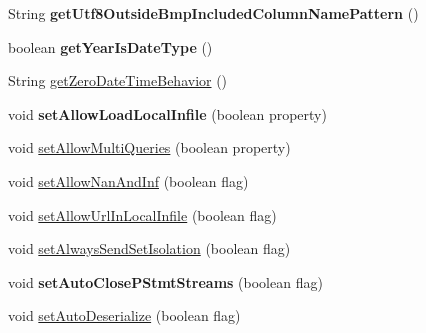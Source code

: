 \begin{DoxyCompactItemize}
\item 
\mbox{\label{classcom_1_1mysql_1_1jdbc_1_1jdbc2_1_1optional_1_1_connection_wrapper_a30e517662fc73bd209e067b44aeef223}} 
String {\bfseries get\+Utf8\+Outside\+Bmp\+Included\+Column\+Name\+Pattern} ()
\item 
\mbox{\label{classcom_1_1mysql_1_1jdbc_1_1jdbc2_1_1optional_1_1_connection_wrapper_a85e8f60aaad385ff2588c7a0cbbc981c}} 
boolean {\bfseries get\+Year\+Is\+Date\+Type} ()
\item 
String \mbox{\hyperlink{classcom_1_1mysql_1_1jdbc_1_1jdbc2_1_1optional_1_1_connection_wrapper_a018005289e60ac341a0911f9e1f9dbb8}{get\+Zero\+Date\+Time\+Behavior}} ()
\item 
\mbox{\label{classcom_1_1mysql_1_1jdbc_1_1jdbc2_1_1optional_1_1_connection_wrapper_a4f5c8e5489c20655846fc7d7ddcfd20c}} 
void {\bfseries set\+Allow\+Load\+Local\+Infile} (boolean property)
\item 
void \mbox{\hyperlink{classcom_1_1mysql_1_1jdbc_1_1jdbc2_1_1optional_1_1_connection_wrapper_a4a74a98581dab1e4f5bd0dde12c2ab23}{set\+Allow\+Multi\+Queries}} (boolean property)
\item 
void \mbox{\hyperlink{classcom_1_1mysql_1_1jdbc_1_1jdbc2_1_1optional_1_1_connection_wrapper_a3c630aa077ada90cbaf48a4653043fe5}{set\+Allow\+Nan\+And\+Inf}} (boolean flag)
\item 
void \mbox{\hyperlink{classcom_1_1mysql_1_1jdbc_1_1jdbc2_1_1optional_1_1_connection_wrapper_ae47387cb708cc1dfa15cda434a2738aa}{set\+Allow\+Url\+In\+Local\+Infile}} (boolean flag)
\item 
void \mbox{\hyperlink{classcom_1_1mysql_1_1jdbc_1_1jdbc2_1_1optional_1_1_connection_wrapper_a622e428378e682ed73e80bb82717478c}{set\+Always\+Send\+Set\+Isolation}} (boolean flag)
\item 
\mbox{\label{classcom_1_1mysql_1_1jdbc_1_1jdbc2_1_1optional_1_1_connection_wrapper_aa9c1e0a3ebe9897f7b03166022719f5c}} 
void {\bfseries set\+Auto\+Close\+P\+Stmt\+Streams} (boolean flag)
\item 
void \mbox{\hyperlink{classcom_1_1mysql_1_1jdbc_1_1jdbc2_1_1optional_1_1_connection_wrapper_a4726b80bc80ed09e01a1e2be6e6fee84}{set\+Auto\+Deserialize}} (boolean flag)

\end{DoxyCompactItemize}
